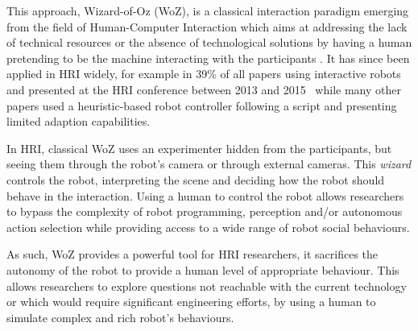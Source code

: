 \documentclass[manuscript, review, anonymous]{acmart}
\newcommand{\ES}[1]{\added[id=ES]{#1}}
\begin{document}
This approach, Wizard-of-Oz (WoZ), is a classical interaction paradigm emerging
from the field of Human-Computer Interaction which aims at addressing the lack
of technical resources or the absence of technological solutions by having a
human pretending to be the machine interacting with the participants
\cite{kelley1983empirical}. It has since been applied in HRI widely, for example
in 39\% of all papers using interactive robots and presented at the HRI
conference between 2013 and 2015~\cite{baxter2016characterising} while many other
papers used a heuristic-based robot controller following a script and presenting 
limited adaption capabilities.

In HRI, classical WoZ uses an experimenter hidden from the participants, but
seeing them through the robot's camera or through external cameras. This \emph{wizard}
controls the robot, interpreting the scene and deciding how the robot should
behave in the interaction. Using a human to control the robot allows researchers
to bypass the complexity of robot programming, perception and/or autonomous
action selection while providing access to a wide range of robot social
behaviours. 

As such, WoZ provides a powerful tool for HRI researchers, it sacrifices the
autonomy of the robot to provide a human level of appropriate behaviour. This
allows researchers to explore questions not reachable with the current
technology or which would require significant engineering efforts, by using a
human to simulate complex and rich robot's behaviours. 

\end{document}
